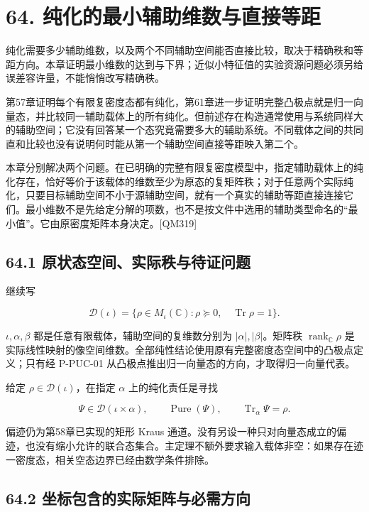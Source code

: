 \documentclass[
  11pt,
  oneside]{book}
\begin{document}
\chapter{64. 纯化的最小辅助维数与直接等距}\label{ch-64}\hypertarget{ch-64}{}

纯化需要多少辅助维数，以及两个不同辅助空间能否直接比较，取决于精确秩和等距方向。本章证明最小维数的达到与下界；近似小特征值的实验资源问题必须另给误差容许量，不能悄悄改写精确秩。

第57章证明每个有限复密度态都有纯化，第61章进一步证明完整凸极点就是归一向量态，并比较同一辅助载体上的所有纯化。但前述存在构造通常使用与系统同样大的辅助空间；它没有回答某一个态究竟需要多大的辅助系统。不同载体之间的共同直和比较也没有说明何时能从第一个辅助空间直接等距映入第二个。

本章分别解决两个问题。在已明确的完整有限复密度模型中，指定辅助载体上的纯化存在，恰好等价于该载体的维数至少为原态的复矩阵秩；对于任意两个实际纯化，只要目标辅助空间不小于源辅助空间，就有一个真实的辅助等距直接连接它们。最小维数不是先给定分解的项数，也不是按文件中选用的辅助类型命名的``最小值''。它由原密度矩阵本身决定。{[}QM319{]}

\section{64.1 原状态空间、实际秩与待证问题}

继续写

\[
\mathcal D(\iota)=\{\rho\in M_\iota(\mathbb C):\rho\succeq0,\quad
\operatorname{Tr}\rho=1\}.
\]

\(\iota,\alpha,\beta\) 都是任意有限载体，辅助空间的复维数分别为
\(|\alpha|,|\beta|\)。矩阵秩 \(\operatorname{rank}_{\mathbb C}\rho\)
是实际线性映射的像空间维数。全部纯性结论使用原有完整密度态空间中的凸极点定义；只有经
P-PUC-01 从凸极点推出归一向量态的方向，才取得归一向量代表。

给定 \(\rho\in\mathcal D(\iota)\)，在指定 \(\alpha\) 上的纯化责任是寻找

\[
\Psi\in\mathcal D(\iota\times\alpha),\qquad
\operatorname{Pure}(\Psi),\qquad
\operatorname{Tr}_\alpha\Psi=\rho.
\]

偏迹仍为第58章已实现的矩形 Kraus
通道。没有另设一种只对向量态成立的偏迹，也没有缩小允许的联合态集合。主定理不额外要求输入载体非空：如果存在迹一密度态，相关空态边界已经由数学条件排除。

\section{64.2 坐标包含的实际矩阵与必需方向}
\end{document}
